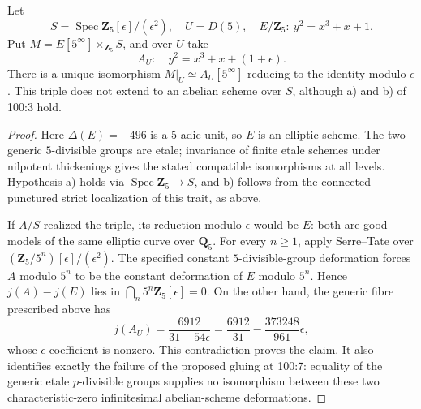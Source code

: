 \begin{proposition}\label{prop:C-RD5}
Let
\[
 S=\operatorname{Spec}\mathbf Z_5[\epsilon]/(\epsilon^2),\quad U=D(5),
 \quad E/\mathbf Z_5:\ y^2=x^3+x+1.
\]
Put $M=E[5^\infty]\times_{\mathbf Z_5}S$, and over $U$ take
\[
 A_U:\quad y^2=x^3+x+(1+\epsilon).
\]
There is a unique isomorphism $M|_U\simeq A_U[5^\infty]$ reducing to the
identity modulo $\epsilon$. This triple does not extend to an abelian
scheme over $S$, although a) and b) of 100:3 hold.
\end{proposition}
\begin{proof}
Here $\Delta(E)=-496$ is a $5$-adic unit, so $E$ is an elliptic scheme.
The two generic $5$-divisible groups are etale; invariance of finite
etale schemes under nilpotent thickenings gives the stated compatible
isomorphisms at all levels. Hypothesis a) holds via
$\operatorname{Spec}\mathbf Z_5\to S$, and b) follows from the connected
punctured strict localization of this trait, as above.

If $A/S$ realized the triple, its reduction modulo $\epsilon$ would be
$E$: both are good models of the same elliptic curve over $\mathbf Q_5$.
For every $n\geq1$, apply Serre--Tate over
$(\mathbf Z_5/5^n)[\epsilon]/(\epsilon^2)$. The specified constant
$5$-divisible-group deformation forces $A$ modulo $5^n$ to be the
constant deformation of $E$ modulo $5^n$. Hence
$j(A)-j(E)$ lies in $\bigcap_n5^n\mathbf Z_5[\epsilon]=0$.
On the other hand, the generic fibre prescribed above has
\[
 j(A_U)=\frac{6912}{31+54\epsilon}
 =\frac{6912}{31}-\frac{373248}{961}\epsilon,
\]
whose $\epsilon$ coefficient is nonzero. This contradiction proves the
claim. It also identifies exactly the failure of the proposed gluing
at 100:7: equality of the generic etale $p$-divisible groups supplies no
isomorphism between these two characteristic-zero infinitesimal
abelian-scheme deformations.
\end{proof}
